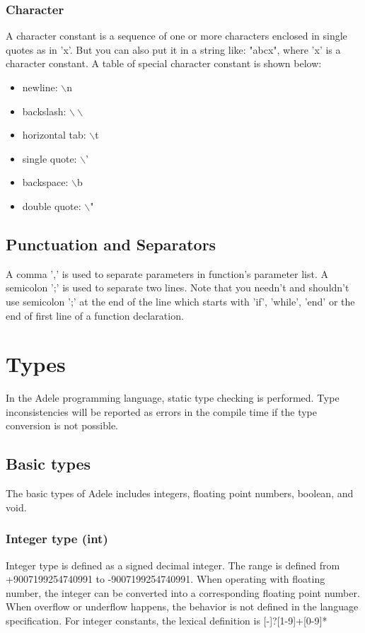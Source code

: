 \documentclass[11pt,letterpaper]{article}
\begin{document}
\subsubsection* {Character}
A character constant is a sequence of one or more characters enclosed in single quotes as in 'x'. But you can also put it in a string like: "abcx", where 'x' is a character constant. A table of special character constant is shown below:
\begin{itemize}
	\item newline: $\backslash$n
	\item backslash: $\backslash\backslash$               
	\item horizontal tab: $\backslash$t         
    \item single quote: $\backslash$'         
    \item backspace: $\backslash$b             
    \item double quote: $\backslash$"  
\end{itemize}

\subsection {Punctuation and Separators}
A comma ',' is used to separate parameters in function's parameter list. A semicolon ';' is used to separate two lines. Note that you needn't and shouldn't use semicolon ';' at the end of the line which starts with 'if', 'while', 'end' or the end of first line of a function declaration. 

\section {Types}
In the Adele programming language, static type checking is performed. Type inconsistencies will be reported as errors in the compile time if the type conversion is not possible. 

\subsection{Basic types}
The basic types of Adele includes integers, floating point numbers, boolean, and void.

\subsubsection*{Integer type (int)} 
Integer type is defined as a signed decimal integer. The range is defined from +9007199254740991 to -9007199254740991. When operating with floating number, the integer can be converted into a corresponding floating point number. When overflow or underflow happens, the behavior is not defined in the language specification. For integer constants, the lexical definition is [-]?[1-9]+[0-9]* \textbar [0]
\end{document}
